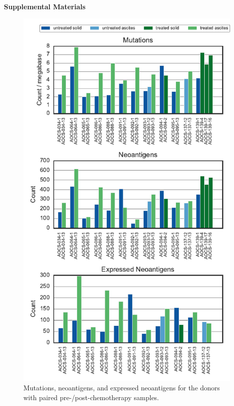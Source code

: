 
\pagebreak
\begin{center}
\textbf{\large Supplemental Materials}
\end{center}

\setcounter{equation}{0}
\setcounter{figure}{0}
\setcounter{table}{0}
\makeatletter
\renewcommand{\theequation}{S\arabic{equation}}
\renewcommand{\thefigure}{S\arabic{figure}}

\begin{figure}
\centering
\includegraphics[scale=1.0]{figures/paired_counts.pdf}
\caption{Mutations, neoantigens, and expressed neoantigens for the donors with paired pre-/post-chemotherapy samples.}
\label{fig:supp_paired}
\end{figure}

